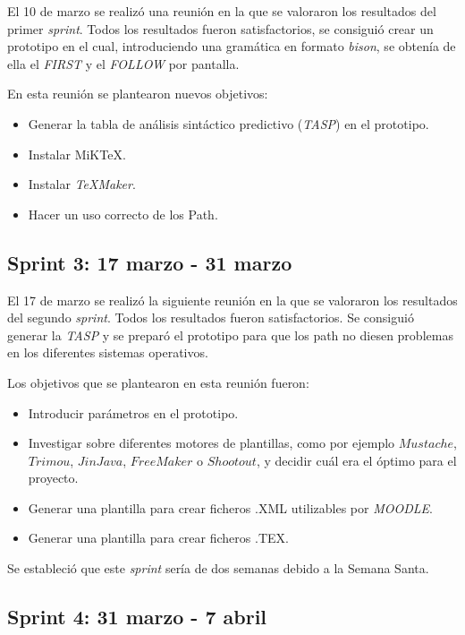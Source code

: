 El 10 de marzo se realizó una reunión en la que se valoraron los resultados del primer \textit{sprint}. Todos los resultados fueron satisfactorios, se consiguió crear un prototipo en el cual, introduciendo una gramática en formato \textit{bison}, se obtenía de ella el \textit{FIRST} y el \textit{FOLLOW} por pantalla.

En esta reunión se plantearon nuevos objetivos: 

\begin{itemize}
\item Generar la tabla de análisis sintáctico predictivo (\textit{TASP}) en el prototipo.
\item Instalar MiK\TeX{}.
\item Instalar \textit{\TeX{}Maker}.
\item Hacer un uso correcto de los Path.
\end{itemize}


\subsection{Sprint 3: 17 marzo - 31 marzo}

El 17 de marzo se realizó la siguiente reunión en la que se valoraron los resultados del segundo \textit{sprint}. Todos los resultados fueron satisfactorios. Se consiguió generar la \textit{TASP} y se preparó el prototipo para que los path no diesen problemas en los diferentes sistemas operativos.
 
Los objetivos que se plantearon en esta reunión fueron:

\begin{itemize}
\item Introducir parámetros en el prototipo.
\item Investigar sobre diferentes motores de plantillas, como por ejemplo $Mustache$, $Trimou$, $JinJava$, $FreeMaker$ o $Shootout$, y decidir cuál era el óptimo para el proyecto.
\item Generar una plantilla para crear ficheros .XML utilizables por \textit{MOODLE}.
\item Generar una plantilla para crear ficheros .TEX. 
\end{itemize}

Se estableció que este \textit{sprint} sería de dos semanas debido a la Semana Santa.



\subsection{Sprint 4: 31 marzo - 7 abril}

